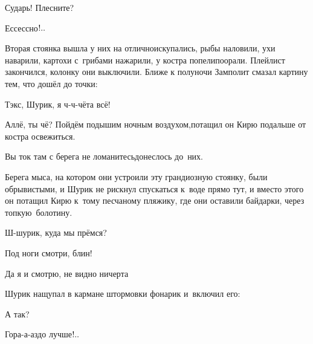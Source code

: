 \diagdash Сударь! Плесните?

\diagdash Ессессно$\exldots$



\vspace{0.1cm}
\myldots{}Вторая стоянка вышла у них на отлично\mdash искупались, рыбы наловили, ухи наварили, картохи с~грибами нажарили, у костра попели\sdash поорали. Плейлист закончился, колонку они выключили. Ближе к полуночи Замполит смазал картину тем, что дошёл до точки:

\diagdash Тэк\sdash с, Шурик, я ч-ч-чёта всё!

\diagdash Аллё, ты чё? Пойдём подышим ночным воздухом,\mdash потащил он Кирю подальше от костра освежиться.

%
%
%

\diagdash Вы ток там с берега не ломанитесь\myldots{}\mdash донеслось до~них.

Берега мыса, на котором они устроили эту грандиозную стоянку, были обрывистыми, и Шурик не рискнул спускаться к~воде прямо тут, и вместо этого он потащил Кирю к~тому песчаному пляжику, где они оставили байдарки, через топкую~болотину.

\diagdash Ш-шурик, куда мы прёмся?

\diagdash Под ноги смотри, блин!

\diagdash Да я и смотрю, не видно ничерта\myldots{}

Шурик нащупал в кармане штормовки фонарик и~включил его:

\diagdash А так?

\diagdash Гора-а-аздо лучше$\exldots$

\vspace{0.4cm}

\renewcommand*{\thefootnote}{\fnsymbol{footnote}}
\setcounter{footnote}{0}

